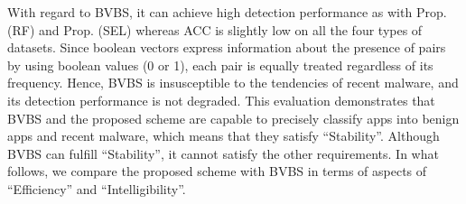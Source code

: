 \documentclass{ieeeaccess}
\begin{document}
With regard to BVBS, it can achieve high detection performance as with Prop. (RF) and Prop. (SEL) whereas ACC is slightly low on all the four types of datasets.
Since boolean vectors express information about the presence of pairs by using boolean values (0 or 1), each pair is equally treated regardless of its frequency.
Hence, BVBS is insusceptible to the tendencies of recent malware, and its detection performance is not degraded.
This evaluation demonstrates that BVBS and the proposed scheme are capable to precisely classify apps into benign apps and recent malware, which means that they satisfy ``Stability''.
Although BVBS can fulfill ``Stability'', it cannot satisfy the other requirements.
In what follows, we compare the proposed scheme with BVBS in terms of aspects of ``Efficiency'' and ``Intelligibility''.


\end{document}
